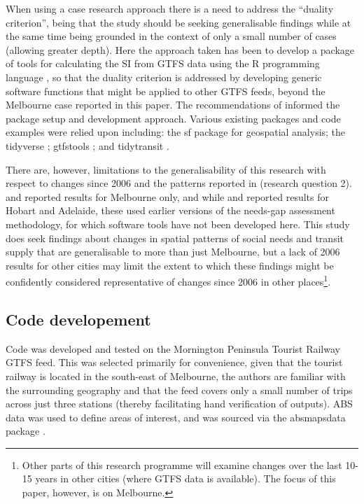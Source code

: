 \documentclass[preprint, 3p,
authoryear]{elsarticle} %
\begin{document}
When using a case research approach there is a need to address the
``duality criterion'', being that the study should be seeking
generalisable findings while at the same time being grounded in the
context of only a small number of cases (allowing greater
depth)\citep{Denscombe2007aa, Ketokivi2014aa}. Here the approach taken
has been to develop a package of tools for calculating the SI from GTFS
data using the R programming language \citep{R-base}, so that the
duality criterion is addressed by developing generic software functions
that might be applied to other GTFS feeds, beyond the Melbourne case
reported in this paper. The recommendations of \citet{wickham2023r}
informed the package setup and development approach. Various existing
packages and code examples were relied upon including: the sf package
\citep{R-sf} for geospatial analysis; the tidyverse
\citep{tidyverse2019}; gtfstools \citep{R-gtfstools}; and tidytransit
\citep{R-tidytransit}.

There are, however, limitations to the generalisability of this research
with respect to changes since 2006 and the patterns reported in
\citet{currie2010identifying}(research question 2).
\citet{Currie2007Identifying} and \citet{currie2010identifying} reported
results for Melbourne only, and while \citet{Currie2003Hobart} and
\citet{Currie2004Gap} reported results for Hobart and Adelaide, these
used earlier versions of the needs-gap assessment methodology, for which
software tools have not been developed here. This study does seek
findings about changes in spatial patterns of social needs and transit
supply that are generalisable to more than just Melbourne, but a lack of
2006 results for other cities may limit the extent to which these
findings might be confidently considered representative of changes since
2006 in other places\footnote{Other parts of this research programme
  will examine changes over the last 10-15 years in other cities (where
  GTFS data is available). The focus of this paper, however, is on
  Melbourne.}.

\subsection{Code developement}\label{code-developement}

Code was developed and tested on the Mornington Peninsula Tourist
Railway GTFS feed. This was selected primarily for convenience, given
that the tourist railway is located in the south-east of Melbourne, the
authors are familiar with the surrounding geography and that the feed
covers only a small number of trips across just three stations (thereby
facilitating hand verification of outputs). ABS data was used to define
areas of interest, and was sourced via the absmapsdata package
\citep{R-absmapsdata}.
\end{document}
